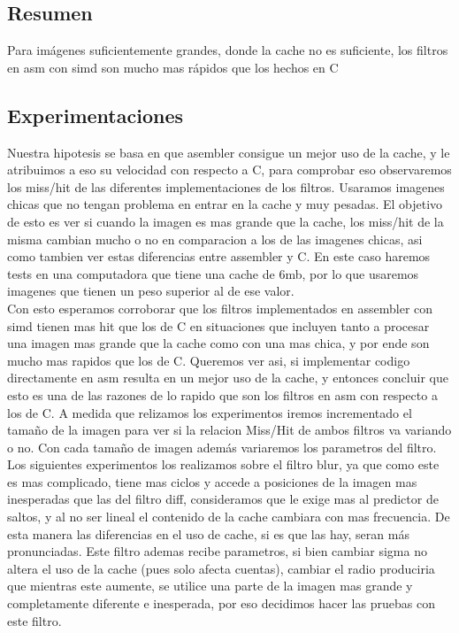 \subsection{Resumen}

Para imágenes suficientemente grandes, donde la cache no es suficiente, los filtros en asm con simd son mucho mas rápidos que los hechos en C

\subsection{Experimentaciones}

Nuestra hipotesis se basa en que asembler consigue un mejor uso de la cache, y le atribuimos a eso su velocidad con respecto a C, para comprobar eso observaremos los miss/hit de las diferentes implementaciones de los filtros. Usaramos imagenes chicas que no tengan problema en entrar en la cache y muy pesadas. El objetivo de esto es ver si cuando la imagen es mas grande que la cache, los miss/hit de la misma cambian mucho o no en comparacion a los de las imagenes chicas, asi como tambien ver estas diferencias entre assembler y C. En este caso haremos tests en una computadora que tiene una cache de 6mb, por lo que usaremos imagenes que tienen un peso superior al de ese valor. \\


Con esto esperamos corroborar que los filtros implementados en assembler con simd tienen mas hit que los de C en situaciones que incluyen tanto a procesar una imagen mas grande que la cache como con una mas chica, y por ende son mucho mas rapidos que los de C. Queremos ver asi, si implementar codigo directamente en asm resulta en un mejor uso de la cache, y entonces concluir que esto es una de las razones de lo rapido que son los filtros en asm con respecto a los de C. A medida que relizamos los experimentos iremos incrementado el tamaño de la imagen para ver si la relacion Miss/Hit de ambos filtros va variando o no. Con cada tamaño de imagen además variaremos los parametros del filtro. \\


Los siguientes experimentos los realizamos sobre el filtro blur, ya que como este es mas complicado, tiene mas ciclos y accede a posiciones de la imagen mas inesperadas que las del filtro diff, consideramos que le exige mas al predictor de saltos, y al no ser lineal el contenido de la cache cambiara con mas frecuencia. De esta manera las diferencias en el uso de cache, si es que las hay, seran más pronunciadas. Este filtro ademas recibe parametros, si bien cambiar sigma no altera el uso de la cache (pues solo afecta cuentas), cambiar el radio produciria que mientras este aumente, se utilice una parte de la imagen mas grande y completamente diferente e inesperada, por eso decidimos hacer las pruebas con este filtro. \\


